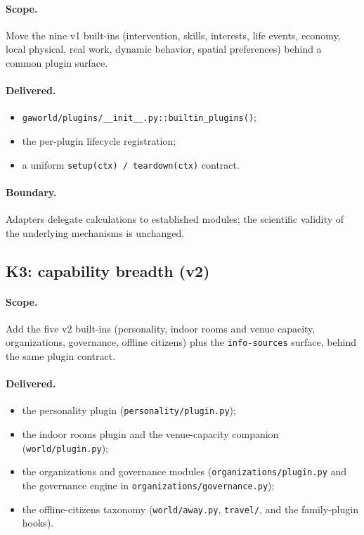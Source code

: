 \paragraph{Scope.}  Move the nine v1 built-ins (intervention, skills,
interests, life events, economy, local physical, real work, dynamic
behavior, spatial preferences) behind a common plugin surface.

\paragraph{Delivered.}
\begin{itemize}[leftmargin=*]
  \item \texttt{gaworld/plugins/\_\_init\_\_.py::builtin\_plugins()};
  \item the per-plugin lifecycle registration;
  \item a uniform \texttt{setup(ctx) / teardown(ctx)} contract.
\end{itemize}

\paragraph{Boundary.}
Adapters delegate calculations to established modules; the scientific
validity of the underlying mechanisms is unchanged.

\subsection{K3: capability breadth (v2)}

\paragraph{Scope.}  Add the five v2 built-ins (personality, indoor rooms
and venue capacity, organizations, governance, offline citizens) plus the
\texttt{info-sources} surface, behind the same plugin contract.

\paragraph{Delivered.}
\begin{itemize}[leftmargin=*]
  \item the personality plugin (\texttt{personality/plugin.py});
  \item the indoor rooms plugin and the venue-capacity companion
  (\texttt{world/plugin.py});
  \item the organizations and governance modules
  (\texttt{organizations/plugin.py} and the governance engine in
  \texttt{organizations/governance.py});
  \item the offline-citizens taxonomy (\texttt{world/away.py},
  \texttt{travel/}, and the family-plugin hooks).
\end{itemize}

